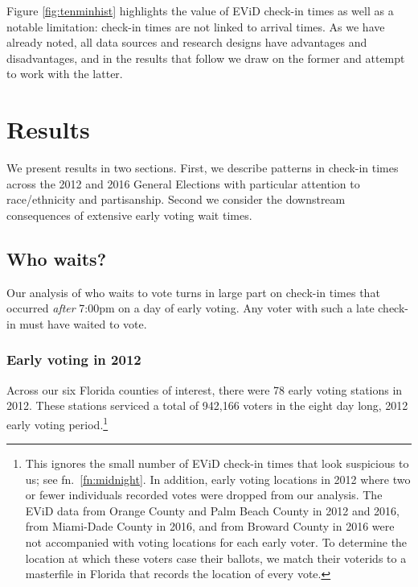 \documentclass[12pt,titlepage]{article}
\begin{document}
Figure \ref{fig:tenminhist} highlights the value of EViD check-in
times as well as a notable limitation: check-in times are not linked
to arrival times.  As we have already noted, all data sources and
research designs have advantages and disadvantages, and in the results
that follow we draw on the former and attempt to work with the latter.

\section*{Results}

We present results in two sections.  First, we describe patterns in
check-in times across the 2012 and 2016 General Elections with
particular attention to race/ethnicity and partisanship.  Second we
consider the downstream consequences of extensive early voting wait
times.


\subsection*{Who waits?}

Our analysis of who waits to vote turns in large part on check-in
times that occurred \emph{after} 7:00pm on a day of early voting.  Any
voter with such a late check-in must have waited to vote.

\subsubsection*{Early voting in 2012}

Across our six Florida counties of interest, there were 78 early
voting stations in 2012.  These stations serviced a total of 942,166
voters in the eight day long, 2012 early voting period.\footnote{This
  ignores the small number of EViD check-in times that look suspicious
  to us; see fn.\ \ref{fn:midnight}.  In addition, early voting
  locations in 2012 where two or fewer individuals recorded votes were
  dropped from our analysis.  The EViD data from Orange County and
  Palm Beach County in 2012 and 2016, from Miami-Dade County in 2016,
  and from Broward County in 2016 were not accompanied with voting
  locations for each early voter.  To determine the location at which
  these voters case their ballots, we match their voterids to a
  masterfile in Florida that records the location of every
  vote.}  %
\end{document}
